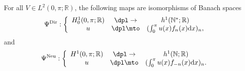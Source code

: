 \begin{proposition}
\label{prop_isom_Hilb}
For all $V\in L^2(0,\pi;\mathbb{R})$, the following maps are isomorphisms of Banach spaces
\[
\Psi^{\mathrm{Dir}}:\left\{ \begin{array}{ccc} H^1_0(0,\pi;\mathbb{R}) & \dpl\to & h^1(\mathbb{N}^*;\mathbb{R}) \\
u & \dpl\mto & (\int_0^\pi u(x) f_n(x) \mathrm{d}x)_n,
\end{array} \right.
\]
and
\[
\Psi^{\mathrm{Neu}}:\left\{ \begin{array}{ccc} H^1(0,\pi;\mathbb{R}) & \dpl\to & h^1(\mathbb{N};\mathbb{R}) \\
u & \dpl\mto & (\int_0^\pi u(x) f_{-n}(x) \mathrm{d}x)_n.
\end{array} \right.
\]
\end{proposition}
